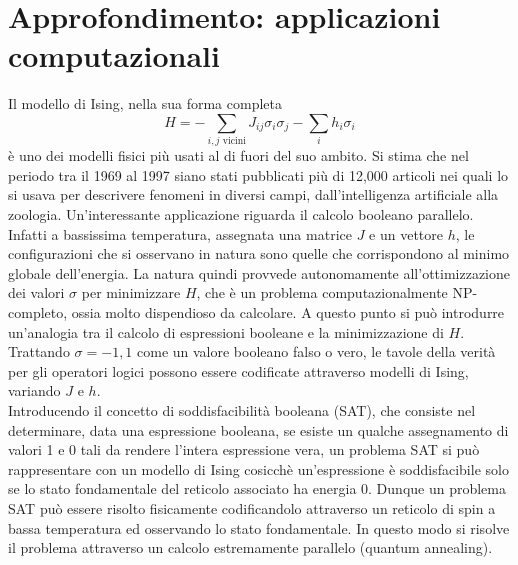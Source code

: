 \documentclass[Lau, noexaminfo, oneside]{sapthesis} %
\begin{document}
\section{Approfondimento: applicazioni computazionali}
Il modello di Ising, nella sua forma completa
\begin{equation}
H = - \sum_{i,j \text{ vicini}} J_{ij} \sigma_i \sigma_j - \sum_i h_i \sigma_i
\end{equation}
è uno dei modelli fisici più usati al di fuori del suo ambito. Si stima che nel periodo tra il 1969 al 1997 siano stati pubblicati più di 12,000 articoli nei quali lo si usava per descrivere fenomeni in diversi campi, dall'intelligenza artificiale alla zoologia. \cite{dwave}
Un'interessante applicazione riguarda il calcolo booleano parallelo. Infatti a bassissima temperatura, assegnata una matrice $J$ e un vettore $h$, le configurazioni che si osservano in natura sono quelle che corrispondono al minimo globale dell'energia. La natura quindi provvede autonomamente all'ottimizzazione dei valori $\sigma$ per minimizzare $H$, che è un problema computazionalmente NP-completo, ossia molto dispendioso da calcolare. A questo punto si può introdurre un'analogia tra il calcolo di espressioni booleane e la minimizzazione di $H$. Trattando $\sigma=-1, 1$ come un valore booleano falso o vero, le tavole della verità per gli operatori logici possono essere codificate attraverso modelli di Ising, variando $J$ e $h$.\\ Introducendo il concetto di soddisfacibilità booleana (SAT), che consiste nel determinare, data una espressione booleana, se esiste un qualche assegnamento di valori 1 e 0 tali da rendere l'intera espressione vera, un problema SAT si può rappresentare con un modello di Ising cosicchè un'espressione è soddisfacibile solo se lo stato fondamentale del reticolo associato ha energia 0. Dunque un problema SAT può essere risolto fisicamente codificandolo attraverso un reticolo di spin a bassa temperatura ed osservando lo stato fondamentale. In questo modo si risolve il problema attraverso un calcolo estremamente parallelo (quantum annealing).\cite{quantumannealing}
\end{document}
